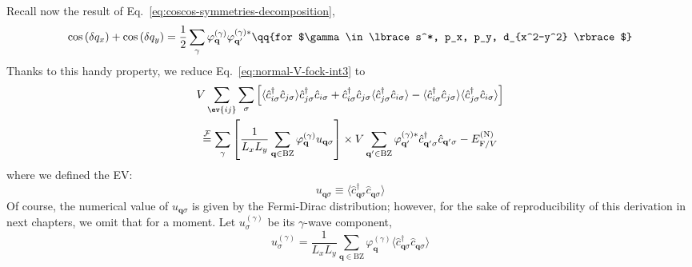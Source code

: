 Recall now the result of Eq.~\eqref{eq:coscos-symmetries-decomposition},
\[
	\cos \left( \delta q_x \right)	+ \cos \left( \delta q_y  \right) = \frac 1 2 \sum_\gamma \varphi_\mathbf{q}^{(\gamma)} \varphi_{\mathbf{q}'}^{(\gamma)*}
	\qq{for $\gamma \in \lbrace s^*, p_x, p_y, d_{x^2-y^2} \rbrace$}
\]
Thanks to this handy property, we reduce Eq.~\eqref{eq:normal-V-fock-int3} to
\begin{multline}
	V \sum_{\ev{ij}} \sum_\sigma \left[
	\langle
	\hat c_{i\sigma}^\dagger \hat c_{j\sigma}
	\rangle \hat c_{j\sigma}^\dagger  \hat c_{i\sigma} + 
	\hat c_{i\sigma}^\dagger \hat c_{j\sigma}
	\langle \hat c_{j\sigma}^\dagger  \hat c_{i\sigma} \rangle - \langle \hat c_{i\sigma}^\dagger \hat c_{j\sigma}
	\rangle \langle \hat c_{j\sigma}^\dagger  \hat c_{i\sigma} \rangle
	\right] \\
	\stackrel{\mathcal{F}}{=} \sum_\gamma \left[
		\frac{1}{L_x L_y} \sum_\mathbf{q\in\mathrm{BZ}} \varphi_\mathbf{q}^{(\gamma)}
		u_{\mathbf{q}\sigma}
	\right] \times V
	\sum_{\mathbf{q}'\in\mathrm{BZ}}
	\varphi_{\mathbf{q}'}^{(\gamma)*}
	\hat c_{\mathbf{q}'\sigma}^\dagger
	\hat c_{\mathbf{q}'\sigma} - E_{\mathrm{F}/V}^{(\mathrm{N})} \label{eq:normal-V-fock-int4}
\end{multline}
where we defined the EV:
\begin{equation}\label{eq:normal-uqsigma-def}
	u_{\mathbf{q}\sigma} \equiv \langle
	\hat c_{\mathbf{q}\sigma}^\dagger
	\hat c_{\mathbf{q}\sigma}
	\rangle
\end{equation}
Of course, the numerical value of $u_{\mathbf{q}\sigma}$ is given by the Fermi-Dirac distribution; however, for the sake of reproducibility of this derivation in next chapters, we omit that for a moment. Let $u^{(\gamma)}_\sigma$ be its $\gamma$-wave component,
\[
	u^{(\gamma)}_\sigma = \frac{1}{L_x L_y} \sum_{\mathbf{q}\in\mathrm{BZ}} \varphi_\mathbf{q}^{(\gamma)}
	\langle
	\hat c_{\mathbf{q}\sigma}^\dagger
	\hat c_{\mathbf{q}\sigma}
	\rangle
\]

